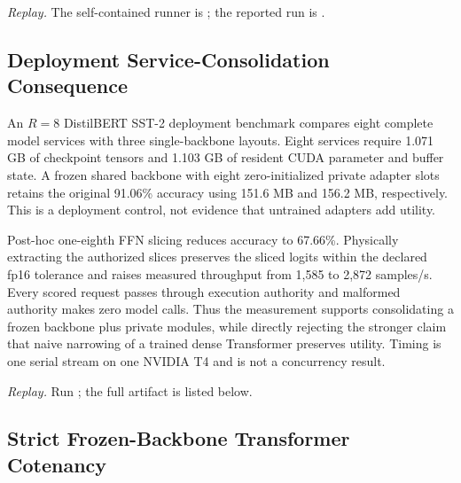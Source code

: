 \documentclass[11pt,a4paper]{article}
\begin{document}
\begin{sloppypar}
\noindent\textit{Replay.} The self-contained runner is
; the reported
run is
.
\end{sloppypar}

\subsection{Deployment Service-Consolidation Consequence}
\label{sec:service-consolidation}

An $R{=}8$ DistilBERT SST-2 deployment benchmark compares eight complete model
services with three single-backbone layouts.  Eight services require 1.071 GB
of checkpoint tensors and 1.103 GB of resident CUDA parameter and buffer state.
A frozen shared backbone with eight zero-initialized private adapter slots
retains the original 91.06\% accuracy using 151.6 MB and 156.2 MB,
respectively.  This is a deployment control, not evidence that untrained
adapters add utility.

Post-hoc one-eighth FFN slicing reduces accuracy to 67.66\%.  Physically
extracting the authorized slices preserves the sliced logits within the
declared fp16 tolerance and raises measured throughput from 1,585 to 2,872
samples/s.  Every scored request passes through execution authority and malformed
authority makes zero model calls.  Thus the measurement supports consolidating
a frozen backbone plus private modules, while directly rejecting the stronger
claim that naive narrowing of a trained dense Transformer preserves utility.
Timing is one serial stream on one NVIDIA T4 and is not a concurrency result.

\begin{sloppypar}
\noindent\textit{Replay.} Run
; the full artifact
is listed below.
\par\smallskip{}
\par
\end{sloppypar}

\subsection{Strict Frozen-Backbone Transformer Cotenancy}
\label{sec:strict-cotenancy}
\end{document}
